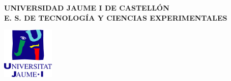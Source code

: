 {%
\thispagestyle{empty}
\begin{center}
{\sffamily \bf
{\Large UNIVERSIDAD JAUME I DE CASTELL\'{O}N}\\

\vspace*{1ex}
{\normalsize E. S. DE TECNOLOG\'{I}A Y CIENCIAS EXPERIMENTALES}\\

\vspace*{15ex}

\centerline{\includegraphics[width=2.5cm]{logo}}

\vspace{\fill}
{\Huge \sc \thetitle \\}

\vspace{\fill}
{\normalsize \sc \theauthor}
\vspace*{34ex}
}
\end{center}

\restoregeometry
}

\makeatother
